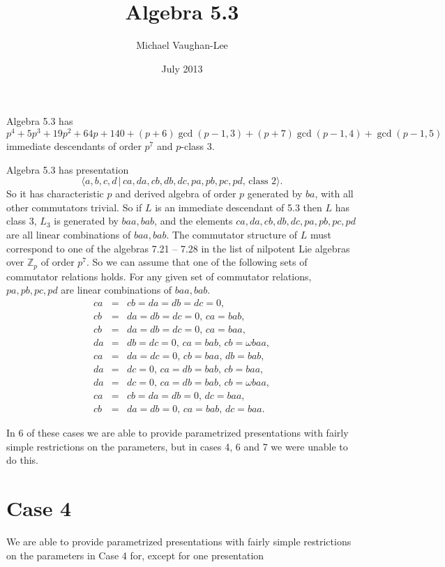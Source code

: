 \documentclass[12pt]{article}
\begin{document}
\title{Algebra 5.3}
\author{Michael Vaughan-Lee}
\date{July 2013}
\maketitle

Algebra 5.3 has $p^{4}+5p^{3}+19p^{2}+64p+140+(p+6)\gcd (p-1,3)+(p+7)\gcd
(p-1,4)+\gcd (p-1,5)$ immediate descendants of order $p^{7}$ and $p$-class 3.

Algebra 5.3 has presentation 
\[
\langle a,b,c,d\,|\,ca,da,cb,db,dc,pa,pb,pc,pd,\,\text{class }2\rangle . 
\]%
So it has characteristic $p$ and derived algebra of order $p$ generated by $%
ba$, with all other commutators trivial. So if $L$ is an immediate
descendant of 5.3 then $L$ has class 3, $L_{3}$ is generated by $baa,bab$,
and the elements $ca,da,cb,db,dc,pa,pb,pc,pd$ are all linear combinations of 
$baa,bab$. The commutator structure of $L$ must correspond to one of the
algebras 7.21 -- 7.28 in the list of nilpotent Lie algebras over $\mathbb{Z}%
_{p}$ of order $p^{7}$. So we can assume that one of the following sets of
commutator relations holds. For any given set of commutator relations, $%
pa,pb,pc,pd$ are linear combinations of $baa,bab$. 
\begin{eqnarray*}
ca &=&cb=da=db=dc=0, \\
cb &=&da=db=dc=0,\,ca=bab, \\
cb &=&da=db=dc=0,\,ca=baa, \\
da &=&db=dc=0,\,ca=bab,\,cb=\omega baa, \\
ca &=&da=dc=0,\,cb=baa,\,db=bab, \\
da &=&dc=0,\,ca=db=bab,\,cb=baa, \\
da &=&dc=0,\,ca=db=bab,\,cb=\omega baa, \\
ca &=&cb=da=db=0,\,dc=baa, \\
cb &=&da=db=0,\,ca=bab,\,dc=baa.
\end{eqnarray*}

In 6 of these cases we are able to provide parametrized presentations with
fairly simple restrictions on the parameters, but in cases 4, 6 and 7 we
were unable to do this.

\section{Case 4}

We are able to provide parametrized presentations with fairly simple
restrictions on the parameters in Case 4 for, except for one presentation
\end{document}
